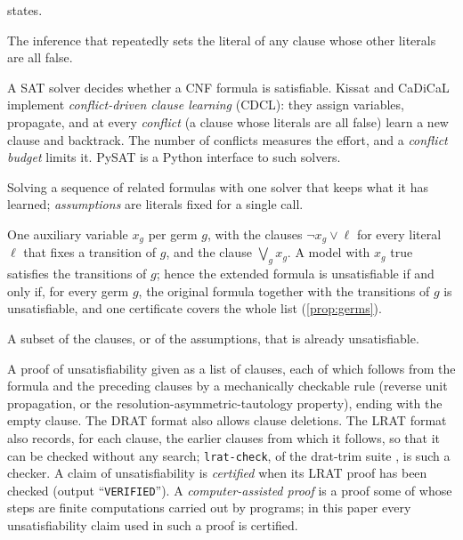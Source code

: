 {\begin{description}[style=unboxed,leftmargin=1em,font=\normalfont\bfseries,itemsep=1pt,parsep=0pt,topsep=2pt]
  states.
\item[Unit propagation.] The inference that repeatedly sets the literal
  of any clause whose other literals are all false.
\item[SAT solver; CDCL; conflict.] A SAT solver decides whether a CNF
  formula is satisfiable. Kissat \cite{Kissat20} and CaDiCaL
  \cite{CaDiCaL2} implement \emph{conflict-driven clause learning} (CDCL):
  they assign variables, propagate, and at every \emph{conflict} (a clause
  whose literals are all false) learn a new clause and backtrack. The number
  of conflicts measures the effort, and a \emph{conflict budget} limits it.
  PySAT \cite{PySAT18} is a Python interface to such solvers.
\item[Incremental solving; assumptions.] Solving a sequence of related
  formulas with one solver that keeps what it has learned;
  \emph{assumptions} are literals fixed for a single call.
\item[Selector variables.] One auxiliary variable $x_g$ per germ $g$, with
  the clauses $\neg x_g\vee\ell$ for every literal $\ell$ that fixes a
  transition of $g$, and the clause $\bigvee_g x_g$. A model with $x_g$
  true satisfies the transitions of $g$; hence the extended formula is
  unsatisfiable if and only if, for every germ $g$, the original formula
  together with the transitions of $g$ is unsatisfiable, and one
  certificate covers the whole list (\cref{prop:germs}).
\item[Unsatisfiable core.] A subset of the clauses, or of the
  assumptions, that is already unsatisfiable.
\item[Proof certificate; DRAT; LRAT; certified.] A proof of
  unsatisfiability given as a list of clauses, each of which follows from
  the formula and the preceding clauses by a mechanically checkable rule
  (reverse unit propagation, or the resolution-asymmetric-tautology
  property), ending with the empty clause. The DRAT format also allows
  clause deletions. The LRAT format \cite{CruzFilipeEtAl17} also records,
  for each clause, the earlier clauses from which it follows, so that it
  can be checked without any search; \texttt{lrat-check}, of the \textsf{drat-trim}
  suite \cite{WetzlerHeuleHunt14}, is such a checker. A claim of
  unsatisfiability is \emph{certified} when its LRAT proof has been
  checked (output ``\texttt{VERIFIED}''). A \emph{computer-assisted proof}
  is a proof some of whose steps are finite computations carried out by
  programs; in this paper every unsatisfiability claim used in such a proof
  is certified.

\end{description}}
